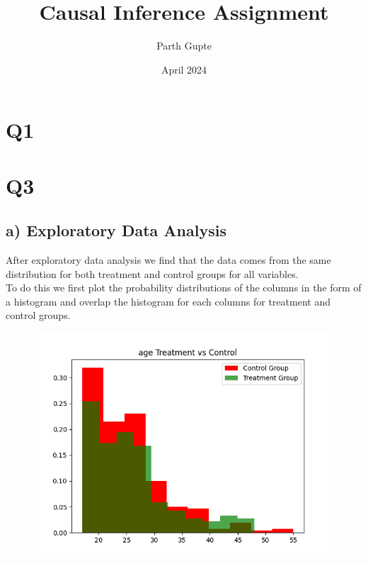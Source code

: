 \documentclass{article}
\title{Causal Inference Assignment}
\author{Parth Gupte}
\date{April 2024}
\begin{document}
\maketitle

\section{Q1}

\section{Q3}
\subsection{a) Exploratory Data Analysis}
After exploratory data analysis we find that the data comes from the same distribution for both treatment and control groups for all variables.\\
To do this we first plot the probability distributions of the columns in the form of a histogram and overlap the histogram for each 
columns for treatment and control groups.\\
\begin{figure}
    \centering
    \includegraphics[width = 15 cm]{../age_cts_hist_plot.png}
\end{figure}
\end{document}
